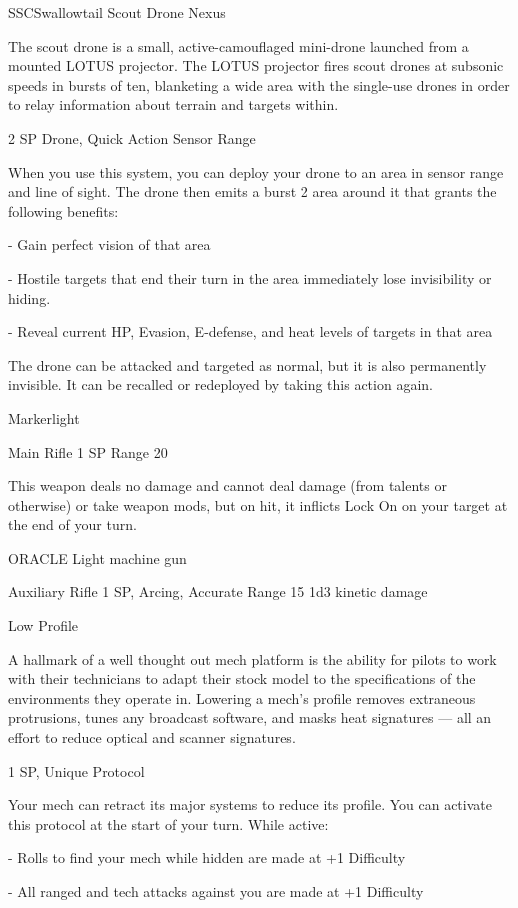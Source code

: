 \begin{mech}{SSC}{Swallowtail}
Scout Drone Nexus

The scout drone is a small, active-camouflaged mini-drone launched from a mounted LOTUS projector. The LOTUS projector fires scout drones at subsonic speeds in bursts of ten, blanketing a wide area with the single-use drones in order to relay information about terrain and targets within.

2 SP
Drone, Quick Action
Sensor Range

When you use this system, you can deploy your drone to an area in sensor range and line of sight. The drone then emits a burst 2 area around it that grants the following benefits:

  - Gain perfect vision of that area

  - Hostile targets that end their turn in the area immediately lose invisibility or hiding.

  - Reveal current HP, Evasion, E-defense, and heat levels of targets in that area

The drone can be attacked and targeted as normal, but it is also permanently invisible. It can be recalled or redeployed by taking this action again.


Markerlight

Main Rifle
1 SP
Range 20

This weapon deals no damage and cannot deal damage (from talents or otherwise) or take weapon mods, but on hit, it inflicts Lock On on your target at the end of your turn.


ORACLE Light machine gun

Auxiliary Rifle
1 SP, Arcing, Accurate
Range 15
1d3 kinetic damage


Low Profile

A hallmark of a well thought out mech platform is the ability for pilots to work with their technicians to adapt their stock model to the specifications of the environments they operate in. Lowering a mech's profile removes extraneous protrusions, tunes any broadcast software, and masks heat signatures — all an effort to reduce optical and scanner signatures.

1 SP, Unique
Protocol

Your mech can retract its major systems to reduce its profile. You can activate this protocol at the start of your turn. While active:

     -   Rolls to find your mech while hidden are made at +1 Difficulty

     -   All ranged and tech attacks against you are made at +1 Difficulty


\end{mech}
